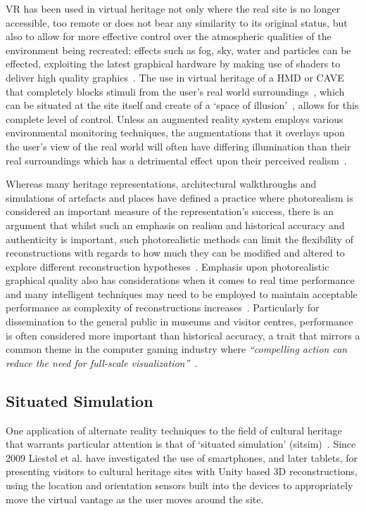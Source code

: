 VR has been used in virtual heritage not only where the real site is no longer accessible, too remote or does not bear any similarity to its original status, but also to allow for more effective control over the atmospheric qualities of the environment being recreated; effects such as fog, sky, water and particles can be effected, exploiting the latest graphical hardware by making use of shaders to deliver high quality graphics~\cite{deamicis:gamebased}. The use in virtual heritage of a HMD or CAVE that completely blocks stimuli from the user's real world surroundings~\cite{cabral:x3dexperience,Christou2006}, which can be situated at the site itself and create of a `space of illusion'~\cite{Tzortzaki2002}, allows for this complete level of control. Unless an augmented reality system employs various environmental monitoring techniques, the augmentations that it overlays upon the user's view of the real world will often have differing illumination than their real surroundings which has a detrimental effect upon their perceived realism~\cite{mcnamara:lightness}.

Whereas many heritage representations, architectural walkthroughs and simulations of artefacts and places have defined a practice where photorealism is considered an important measure of the representation's success, there is an argument that whilst such an emphasis on realism and historical accuracy and authenticity is important, such photorealistic methods can limit the flexibility of reconstructions with regards to how much they can be modified and altered to explore different reconstruction hypotheses~\cite{roussou:photorealism}. Emphasis upon photorealistic graphical quality also has considerations when it comes to real time performance and many intelligent techniques may need to be employed to maintain acceptable performance as complexity of reconstructions increases~\cite{willmott:largecomplex}. Particularly for dissemination to the general public in museums and visitor centres, performance is often considered more important than historical accuracy, a trait that mirrors a common theme in the computer gaming industry where \textit{``compelling action can reduce the need for full-scale visualization''}~\cite{Heim2014}.


\subsection{Situated Simulation}
\label{situated-simulation}
One application of alternate reality techniques to the field of cultural heritage that warrants particular attention is that of `situated simulation' (sitsim)~\cite{Liestøl2009}. Since 2009 Liest\o l et al. have investigated the use of smartphones, and later tablets, for presenting visitors to cultural heritage sites with Unity based 3D reconstructions, using the location and orientation sensors built into the devices to appropriately move the virtual vantage as the user moves around the site.

